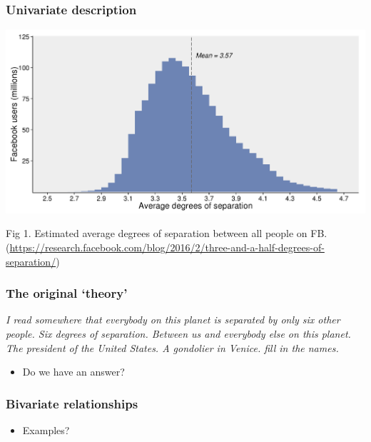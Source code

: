 \documentclass[aspectratio=43]{beamer}
\begin{document}
\begin{frame}
\frametitle{Univariate description}
\centering

\includegraphics[width = \textwidth]{../img/facebook_separation}

{\footnotesize Fig 1. Estimated average degrees of separation between all people on FB.}
{\tiny (\url{https://research.facebook.com/blog/2016/2/three-and-a-half-degrees-of-separation/})}

\end{frame}

\begin{frame}
\frametitle{The original `theory'}
\centering

\textit{I read somewhere that everybody on this planet is separated by only six other people. Six degrees of separation. Between us and everybody else on this planet. The president of the United States. A gondolier in Venice. fill in the names.}\\\vspace{10pt}{\small Six Degrees of Separation, John Guare}

\vspace{20pt}

\begin{itemize}
  \item Do we have an answer?
\end{itemize}

\end{frame}

\begin{frame}
\frametitle{Bivariate relationships}
\centering

\begin{itemize}
  \item Examples?
\end{itemize}

\end{frame}
\end{document}
